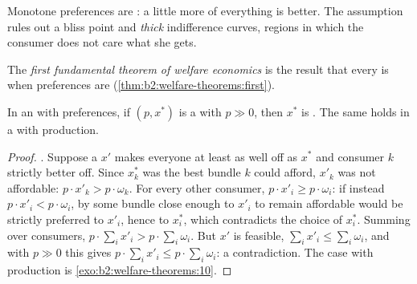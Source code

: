 Monotone preferences are : a little more of everything is better. The assumption
rules out a bliss point and \emph{thick} indifference curves, regions in which the consumer does not care
what she gets.

\begin{definition}\label{def:b2:welfare-theorems:first-theorem}
The \emph{first fundamental theorem of welfare economics} is the result that every   is  when
preferences are  (\cref{thm:b2:welfare-theorems:first}).
\end{definition}

\begin{theorem}\label{thm:b2:welfare-theorems:first}
In an  with  preferences, if $(p, x^*)$ is a 
with $p \gg 0$, then $x^*$ is . The same holds in a  with
production.
\end{theorem}

\begin{proof}
. Suppose a  $x'$ makes everyone at least as well off as $x^*$ and
consumer $k$ strictly better off. Since $x^*_k$ was the best bundle $k$ could afford, $x'_k$ was not
affordable: $p \cdot x'_k > p \cdot \omega_k$. For every other consumer, $p \cdot x'_i \ge p \cdot
\omega_i$: if instead $p \cdot x'_i < p \cdot \omega_i$, by  some bundle close
enough to $x'_i$ to remain affordable would be strictly preferred to $x'_i$, hence to $x^*_i$, which
contradicts the choice of $x^*_i$. Summing over consumers, $p \cdot \sum_i x'_i > p \cdot \sum_i
\omega_i$. But $x'$ is feasible, $\sum_i x'_i \le \sum_i \omega_i$, and with $p \gg 0$ this gives $p \cdot
\sum_i x'_i \le p \cdot \sum_i \omega_i$: a contradiction. The case with production is
\cref{exo:b2:welfare-theorems:10}.
\end{proof}

